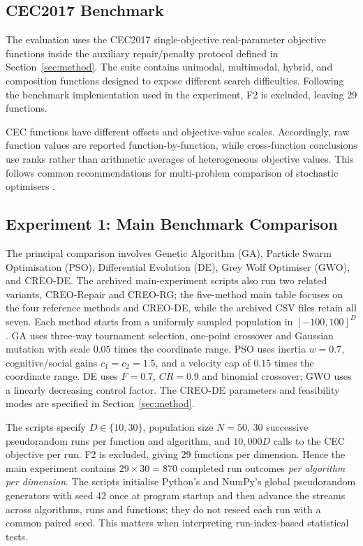\documentclass[journal]{IEEEtran}
\begin{document}
\subsection{CEC2017 Benchmark}

The evaluation uses the CEC2017 single-objective real-parameter objective functions \cite{awad2017cec} inside the auxiliary repair/penalty protocol defined in Section~\ref{sec:method}. The suite contains unimodal, multimodal, hybrid, and composition functions designed to expose different search difficulties. Following the benchmark implementation used in the experiment, F2 is excluded, leaving 29 functions.

CEC functions have different offsets and objective-value scales. Accordingly, raw function values are reported function-by-function, while cross-function conclusions use ranks rather than arithmetic averages of heterogeneous objective values. This follows common recommendations for multi-problem comparison of stochastic optimisers \cite{garcia2009nonparametric,derrac2011tutorial}.

\subsection{Experiment 1: Main Benchmark Comparison}

The principal comparison involves Genetic Algorithm (GA), Particle Swarm Optimisation (PSO), Differential Evolution (DE), Grey Wolf Optimiser (GWO), and CREO-DE. The archived main-experiment scripts also run two related variants, CREO-Repair and CREO-RG; the five-method main table focuses on the four reference methods and CREO-DE, while the archived CSV files retain all seven. Each method starts from a uniformly sampled population in $[-100,100]^D$. GA uses three-way tournament selection, one-point crossover and Gaussian mutation with scale $0.05$ times the coordinate range. PSO uses inertia $w=0.7$, cognitive/social gains $c_1=c_2=1.5$, and a velocity cap of $0.15$ times the coordinate range. DE uses $F=0.7$, $CR=0.9$ and binomial crossover; GWO uses a linearly decreasing control factor. The CREO-DE parameters and feasibility modes are specified in Section~\ref{sec:method}.

The scripts specify $D\in\{10,30\}$, population size $N=50$, 30 successive pseudorandom runs per function and algorithm, and $10{,}000D$ calls to the CEC objective per run. F2 is excluded, giving 29 functions per dimension. Hence the main experiment contains $29\times30=870$ completed run outcomes \emph{per algorithm per dimension}. The scripts initialise Python's and NumPy's global pseudorandom generators with seed 42 once at program startup and then advance the streams across algorithms, runs and functions; they do not reseed each run with a common paired seed. This matters when interpreting run-index-based statistical tests.
\end{document}
